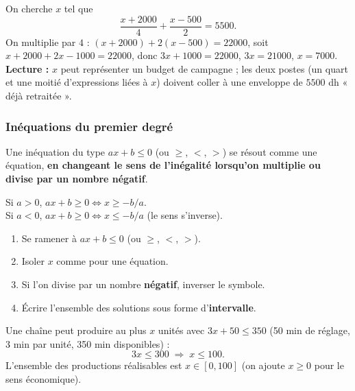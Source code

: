 \documentclass[12pt,a4paper]{article}
\begin{document}
\begin{exemplebox}
On cherche $x$ tel que
$$\frac{x+2000}{4} + \frac{x-500}{2} = 5500.$$
On multiplie par $4$ : $(x+2000) + 2(x-500) = 22000$, soit $x+2000+2x-1000=22000$, donc $3x+1000=22000$, $3x=21000$, $x=7000$.\\
\textbf{Lecture :} $x$ peut représenter un budget de campagne ; les deux postes (un quart et une moitié d'expressions liées à $x$) doivent coller à une enveloppe de $5500$ dh « déjà retraitée ».
\end{exemplebox}

\subsubsection{Inéquations du premier degré}

Une inéquation du type $ax+b \leqslant 0$ (ou $\geqslant$, $<$, $>$) se résout comme une équation, \textbf{en changeant le sens de l'inégalité lorsqu'on multiplie ou divise par un nombre négatif}.

\begin{propbox}
Si $a>0$, $ax+b \geqslant 0 \Leftrightarrow x \geqslant -b/a$.\\
Si $a<0$, $ax+b \geqslant 0 \Leftrightarrow x \leqslant -b/a$ (le sens s'inverse).
\end{propbox}

\begin{methodebox}
\begin{enumerate}[leftmargin=1.3cm]
  \item Se ramener à $ax+b \leqslant 0$ (ou $\geqslant$, $<$, $>$).
  \item Isoler $x$ comme pour une équation.
  \item Si l'on divise par un nombre \textbf{négatif}, inverser le symbole.
  \item Écrire l'ensemble des solutions sous forme d'\textbf{intervalle}.
\end{enumerate}
\end{methodebox}

\begin{exemplebox}
Une chaîne peut produire au plus $x$ unités avec $3x + 50 \leqslant 350$ (50 min de réglage, 3 min par unité, 350 min disponibles) :
$$3x \leqslant 300 \;\Longrightarrow\; x \leqslant 100.$$
L'ensemble des productions réalisables est $x \in [0,100]$ (on ajoute $x\geqslant 0$ pour le sens économique).
\end{exemplebox}
\end{document}
